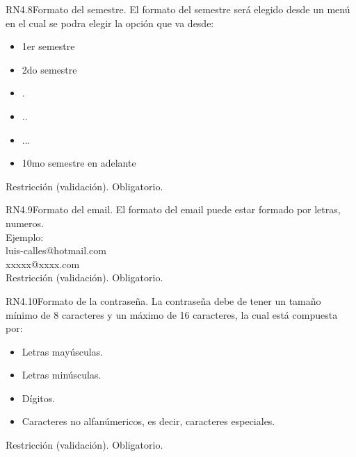\begin{BussinesRule}{RN4.8}{Formato del semestre.} 
	\BRitem[Descripción:] El formato del semestre será elegido desde un menú en el cual se podra elegir la opción que va desde:
		\begin{itemize}
			\item 1er semestre
			\item 2do semestre
			\item .
			\item ..
			\item ...
			\item 10mo semestre en adelante
		\end{itemize}
	\BRitem[Tipo:] Restricción (validación).
	\BRitem[Nivel:] Obligatorio.
\end{BussinesRule}


\begin{BussinesRule}{RN4.9}{Formato del email.} 
	\BRitem[Descripción:] El formato del email puede estar formado por letras, numeros.\\
Ejemplo:\\
	luis-calles@hotmail.com\\
	xxxxx@xxxx.com\\

	\BRitem[Tipo:] Restricción (validación).
	\BRitem[Nivel:] Obligatorio.
\end{BussinesRule}


\begin{BussinesRule}{RN4.10}{Formato de la contraseña.} 
	\BRitem[Descripción:] La contraseña debe de tener un tamaño mínimo de 8 caracteres y un máximo de 16 caracteres, la cual está compuesta por:
		\begin{itemize}	
			\item Letras mayúsculas.
			\item Letras minúsculas.
			\item Dígitos.
			\item Caracteres no alfanúmericos, es decir, caracteres especiales.
		\end{itemize}
	\BRitem[Tipo:] Restricción (validación).
	\BRitem[Nivel:] Obligatorio.
\end{BussinesRule}

